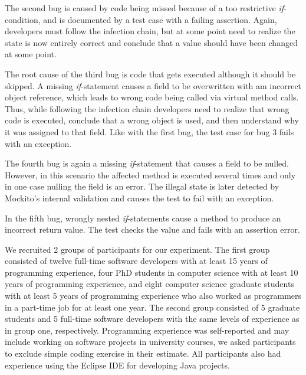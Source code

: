The second bug is caused by code being missed because of a too restrictive \textit{if}-condition, and is documented by a test case with a failing assertion.
Again, developers must follow the infection chain, but at some point need to realize the state is now entirely correct and conclude that a value should have been changed at some point.

The root cause of the third bug is code that gets executed although it should be skipped.
A missing \textit{if}-statement causes a field to be overwritten with am incorrect object reference, which leads to wrong code being called via virtual method calls.
Thus, while following the infection chain developers need to realize that wrong code is executed, conclude that a wrong object is used, and then understand why it was assigned to that field.
Like with the first bug, the test case for bug 3 fails with an exception.

The fourth bug is again a missing \textit{if}-statement that causes a field to be nulled.
However, in this scenario the affected method is executed several times and only in one case nulling the field is an error.
The illegal state is later detected by Mockito's internal validation and causes the test to fail with an exception.

In the fifth bug, wrongly nested \textit{if}-statements cause a method to produce an incorrect return value.
The test checks the value and fails with an assertion error.

We recruited 2 groups of participants for our experiment.
The first group consisted of
twelve full-time software developers with at least 15 years of programming experience, 
four PhD students in computer science with at least 10 years of programming experience,
and eight computer science graduate students with at least 5 years of programming experience who also worked as programmers in a part-time job for at least one year.
The second group consisted of 5 graduate students and 5 full-time software developers with the same levels of experience as in group one, respectively.
Programming experience was self-reported and may include working on software projects in university courses, we asked participants to exclude simple coding exercise in their estimate.
All participants also had experience using the Eclipse IDE for developing Java projects.

